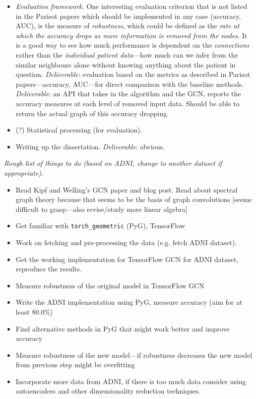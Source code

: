 \documentclass[12pt,a4paper,twoside]{article}
\begin{document}
\begin{itemize}
  \item \textit{Evaluation framework.} One interesting evaluation criterion that is not listed in the Parisot papers which should be implemented in any case (accuracy, AUC), is the measure of \textit{robustness}, which could be defined as the \textit{rate at which the accuracy drops as more information is removed from the nodes}. It is a good way to see how much performance is dependent on the \textit{connections} rather than the \textit{individual patient data}—how much can we infer from the similar neighbours alone without knowing anything about the patient in question. \textit{Deliverable}: evaluation based on the metrics as described in Parisot papers—accuracy, AUC—for direct comparison with the baseline methods. \textit{Deliverable}: an API that takes in the algorithm and the GCN, reports the accuracy measures at each level of removed input data. Should be able to return the actual graph of this accuracy dropping.
  \item (?) Statistical processing (for evaluation).
  \item Writing up the dissertation. \textit{Deliverable}: obvious.
\end{itemize}


\textit{Rough list of things to do (based on ADNI, change to another dataset if appropriate).}
\begin{itemize}
  \item Read Kipf and Welling's GCN paper \cite{kipf2017semi} and blog post. Read about spectral graph theory because that seems to be the basis of graph convolutions [seems difficult to grasp—also revise/study more linear algebra]
  \item Get familiar with \texttt{torch\_geometric} (PyG), TensorFlow
  \item Work on fetching and pre-processing the data (e.g. fetch ADNI dataset).
  \item Get the working implementation for TensorFlow GCN for ADNI dataset, reproduce the results.
  \item Measure robustness of the original model in TensorFlow GCN
  \item Write the ADNI implementation using PyG, measure accuracy (aim for at least 80.0\%)
  \item Find alternative methods in PyG that might work better and improve accuracy
  \item Measure robustness of the new model—if robustness decreases the new model from previous step might be overfitting
  \item Incorporate more data from ADNI, if there is too much data consider using autoencoders and other dimensionality reduction techniques.
\end{itemize}
\end{document}
